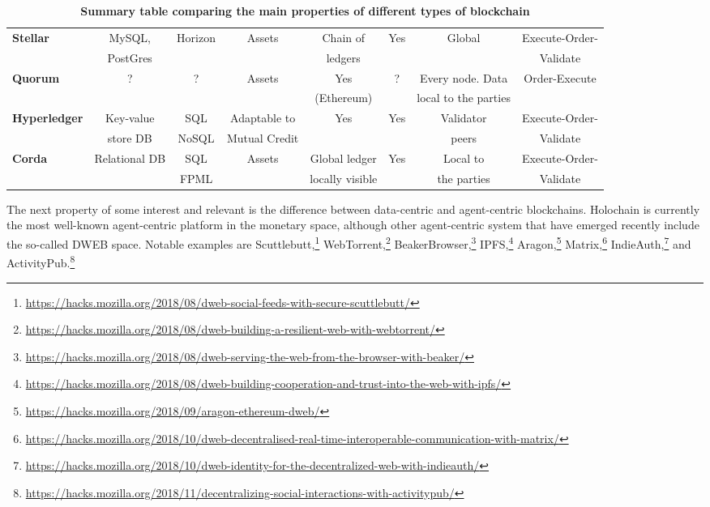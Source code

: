 \begin{table}
\begin{centering}
{\begin{tabular}{| l | c | c | c | c | c | c | c |}
\textbf{Stellar}		&MySQL,		&Horizon			&Assets
				&Chain of		&Yes				&Global			&Execute-Order-\\
				&PostGres	&				&
				&ledgers		&				&				&Validate\\
\hline
\textbf{Quorum} 	&?			&?				&Assets
				&Yes			&?				&Every node. Data	&Order-Execute\\
			 	&			&				&
				&(Ethereum) 	&				&local to the parties		& \\
\hline
\textbf{Hyperledger}	&Key-value	&SQL			&Adaptable to
				&Yes			&Yes				&Validator				&Execute-Order-\\
 				&store DB		&NoSQL			&Mutual Credit
				&			&				&peers				&Validate \\
\hline
\textbf{Corda} 		&Relational DB	&SQL			&Assets
				&Global ledger	&Yes				&Local to				&Execute-Order-\\
		 		&			&FPML			&
				&locally visible 	&				&the parties			&Validate \\
\hline
\end{tabular}}
\caption{\bf \small Summary table comparing the main properties of different types of blockchain}
\label{blockchain_types1}
\end{centering}
\end{table}

The next property of some interest and relevant is the difference between data-centric and agent-centric blockchains. Holochain is currently the most well-known agent-centric platform in the monetary space, although other agent-centric system that have emerged recently include the so-called DWEB space. Notable examples are
Scuttlebutt,\footnote{\url{https://hacks.mozilla.org/2018/08/dweb-social-feeds-with-secure-scuttlebutt/}}
WebTorrent,\footnote{\url{https://hacks.mozilla.org/2018/08/dweb-building-a-resilient-web-with-webtorrent/}}
BeakerBrowser,\footnote{\url{https://hacks.mozilla.org/2018/08/dweb-serving-the-web-from-the-browser-with-beaker/}}
IPFS,\footnote{\url{https://hacks.mozilla.org/2018/08/dweb-building-cooperation-and-trust-into-the-web-with-ipfs/}}
Aragon,\footnote{\url{https://hacks.mozilla.org/2018/09/aragon-ethereum-dweb/}}
Matrix,\footnote{\url{https://hacks.mozilla.org/2018/10/dweb-decentralised-real-time-interoperable-communication-with-matrix/}}
IndieAuth,\footnote{\url{https://hacks.mozilla.org/2018/10/dweb-identity-for-the-decentralized-web-with-indieauth/}}
and ActivityPub.\footnote{\url{https://hacks.mozilla.org/2018/11/decentralizing-social-interactions-with-activitypub/}}


